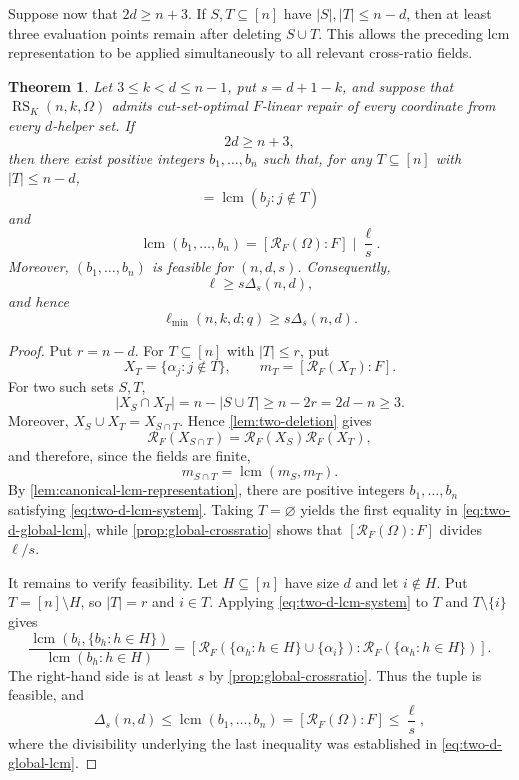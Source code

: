 \documentclass[11pt,onecolumn]{IEEEtran}
\newtheorem{theorem}{Theorem}
\newcommand{\lcmop}{\operatorname{lcm}}
\newcommand{\RS}{\operatorname{RS}}
\newcommand{\crf}{\mathscr R}
\newcommand{\ellmin}{\ell_{\min}}
\begin{document}
Suppose now that $2d\geq n+3$.  If $S,T\subseteq[n]$ have
$|S|,|T|\le n-d$, then at least three evaluation points remain after
deleting $S\cup T$.  This allows the preceding lcm representation to
be applied simultaneously to all relevant cross-ratio fields.

\begin{theorem}
\label{thm:two-d-lower}
Let $3\le k<d\le n-1$, put $s=d+1-k$, and suppose that
$\RS_K(n,k,\Omega)$ admits cut-set-optimal $F$-linear repair of every
coordinate from every $d$-helper set.  If
\[
2d\geq n+3,
\]
then there exist positive integers $b_1,\ldots,b_n$ such that, for any
$T\subseteq[n]$ with $|T|\le n-d$,
\begin{equation}
[\crf_F(\{\alpha_j:j\notin T\}):F]
=\lcmop(b_j:j\notin T)
\label{eq:two-d-lcm-system}
\end{equation}
and
\begin{equation}
\lcmop(b_1,\ldots,b_n)
=[\crf_F(\Omega):F]
\mid\frac{\ell}{s}.
\label{eq:two-d-global-lcm}
\end{equation}
Moreover, $(b_1,\ldots,b_n)$ is feasible for $(n,d,s)$.
Consequently,
\[
\ell\ge s\Delta_s(n,d),
\]
and hence
\[
\ellmin(n,k,d;q)\ge s\Delta_s(n,d).
\]
\end{theorem}

\begin{proof}
Put $r=n-d$.
For $T\subseteq[n]$ with $|T|\le r$, put
\[
X_T=\{\alpha_j:j\notin T\},
\qquad
m_T=[\crf_F(X_T):F].
\]
For two such sets $S,T$,
\[
|X_S\cap X_T|
=n-|S\cup T|
\ge n-2r
=2d-n
\ge3.
\]
Moreover,
$X_S\cup X_T=X_{S\cap T}$.  Hence \cref{lem:two-deletion} gives
\[
\crf_F(X_{S\cap T})=\crf_F(X_S)\crf_F(X_T),
\]
and therefore, since the fields are finite,
\[
m_{S\cap T}=\lcmop(m_S,m_T).
\]
By \cref{lem:canonical-lcm-representation}, there are positive integers
$b_1,\ldots,b_n$ satisfying
\eqref{eq:two-d-lcm-system}.  Taking $T=\varnothing$ yields the first
equality in \eqref{eq:two-d-global-lcm}, while \cref{prop:global-crossratio} shows that
$[\crf_F(\Omega):F]$ divides $\ell/s$.

It remains to verify feasibility.  Let $H\subseteq[n]$ have size $d$
and let $i\notin H$.  Put $T=[n]\setminus H$, so $|T|=r$ and $i\in T$.
Applying \eqref{eq:two-d-lcm-system} to $T$ and
$T\setminus\{i\}$ gives
\[
\frac{\lcmop(b_i,\{b_h:h\in H\})}
     {\lcmop(b_h:h\in H)}
=
[\crf_F(\{\alpha_h:h\in H\}\cup\{\alpha_i\}):
  \crf_F(\{\alpha_h:h\in H\})].
\]
The right-hand side is at least $s$ by
\cref{prop:global-crossratio}.  Thus the tuple is feasible, and
\[
\Delta_s(n,d)
\le\lcmop(b_1,\ldots,b_n)
=[\crf_F(\Omega):F]
\le\frac{\ell}{s},
\]
where the divisibility underlying the last inequality was
established in \eqref{eq:two-d-global-lcm}.
\end{proof}
\end{document}
